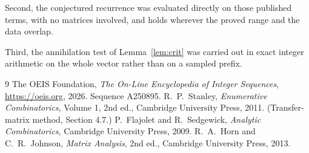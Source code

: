 \documentclass[11pt,a4paper]{article}
\theoremstyle{plain}
\theoremstyle{definition}
\begin{document}
Second, the conjectured recurrence was evaluated directly on those published terms, with no
matrices involved, and holds wherever the proved range and the data overlap.

Third, the annihilation test of Lemma~\ref{lem:crit} was carried out in exact integer
arithmetic on the whole vector rather than on a sampled prefix.

\begin{thebibliography}{9}
 The OEIS Foundation, \emph{The On-Line Encyclopedia of Integer
Sequences}, \url{https://oeis.org}, 2026. Sequence A250895.
 R.~P.~Stanley, \emph{Enumerative Combinatorics}, Volume 1, 2nd ed.,
Cambridge University Press, 2011. (Transfer-matrix method, Section 4.7.)
 P.~Flajolet and R.~Sedgewick, \emph{Analytic Combinatorics}, Cambridge
University Press, 2009.
 R.~A.~Horn and C.~R.~Johnson, \emph{Matrix Analysis}, 2nd ed., Cambridge
University Press, 2013.
\end{thebibliography}
\end{document}
